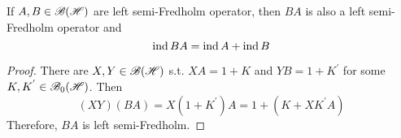 \begin{thm}
	If $A,B \in \mathscr{B(H)}$ are left semi-Fredholm operator, then $BA$ is also a left semi-Fredholm operator and
	\begin{equation*}
		\operatorname{ind}{BA} = \operatorname{ind}{A} + \operatorname{ind}{B}
	\end{equation*}
\end{thm}
\begin{proof}
	There are $X,Y \in \mathscr{B(H)}$ s.t. $XA = 1+K$ and $YB=1+K^{'}$ for some $K,K^{'} \in \mathscr{B}_{0}\mathscr{(H)}$. Then 
	\begin{equation*}
		(XY)(BA) = X(1+K^{'})A = 1 + (K+XK^{'}A)
	\end{equation*}
	Therefore, $BA$ is left semi-Fredholm.
\end{proof}











